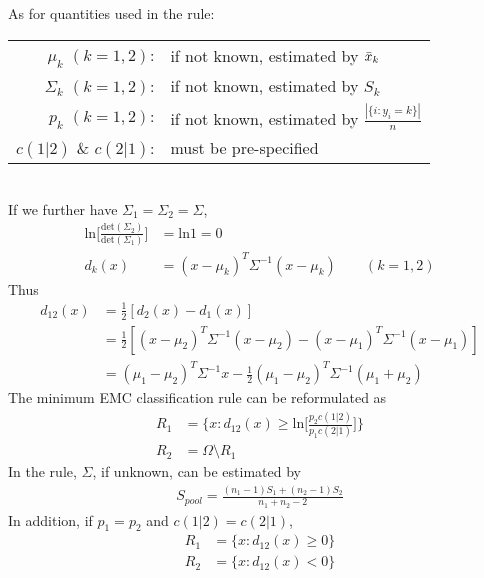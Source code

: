 \documentclass[12pt]{extarticle}
\newcommand{\<}{\langle}
\renewcommand{\>}{\rangle}
\theoremstyle{definition}
\begin{document}
As for quantities used in the rule:\\
\begin{tabular}{rl}
$\mu_k$ $(k=1,2)$:& if not known, estimated by $\Bar{x}_k$\\
$\Sigma_k$ $(k=1,2)$:& if not known, estimated by $S_k$\\
$p_k$ $(k=1,2)$:& if not known, estimated by $\frac{|\{i:y_i =k\}|}{n}$\\
$c(1|2)$ \& $c(2|1)$:& must be pre-specified
\end{tabular}\\

\newpage
If we further have $\Sigma_1 =\Sigma_2 =\Sigma$,
\begin{align*}
    \text{ln}\bigg[\frac{\text{det}(\Sigma_2)}{\text{det}(\Sigma_1)}\bigg] &= \text{ln}1 = 0\\
    d_k(x) &= (x-\mu_k)^T \Sigma^{-1} (x-\mu_k) \qquad (k=1,2)
\end{align*}
Thus
\begin{align*}
    d_{12}(x) &= \frac{1}{2}[d_2(x) -d_1(x)]\\
    &= \frac{1}{2}[(x-\mu_2)^T \Sigma^{-1} (x-\mu_2) -(x-\mu_1)^T \Sigma^{-1} (x-\mu_1)]\\
    &= (\mu_1 -\mu_2)^T \Sigma^{-1} x -\frac{1}{2} (\mu_1 -\mu_2)^T \Sigma^{-1} (\mu_1 +\mu_2)
\end{align*}
The minimum EMC classification rule can be reformulated as
\begin{align*}
    R_1 &= \Bigg\{x:d_{12}(x) \geq \text{ln}\bigg[\frac{p_2 c(1|2)}{p_1 c(2|1)}\bigg] \Bigg\} \\
    R_2 &= \Omega \setminus R_1
\end{align*}
In the rule, $\Sigma$, if unknown, can be estimated by
\begin{align*}
    S_{pool} =\frac{(n_1 -1)S_1 +(n_2 -1)S_2}{n_1 +n_2 -2}
\end{align*}
In addition, if $p_1 =p_2$ and $c(1|2)=c(2|1)$,
\begin{align*}
    R_1 &= \{x:d_{12}(x) \geq 0 \} \\
    R_2 &= \{x:d_{12}(x) < 0 \}
\end{align*}
\end{document}
